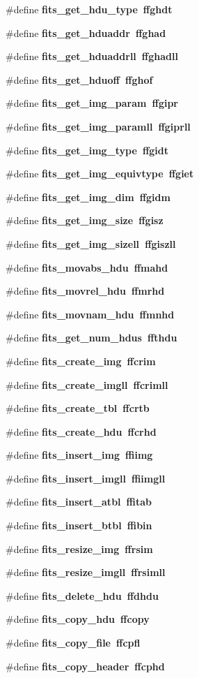 \begin{CompactItemize}
\#define \bf{fits\_\-get\_\-hdu\_\-type}~ffghdt
\item 
\#define \bf{fits\_\-get\_\-hduaddr}~ffghad
\item 
\#define \bf{fits\_\-get\_\-hduaddrll}~ffghadll
\item 
\#define \bf{fits\_\-get\_\-hduoff}~ffghof
\item 
\#define \bf{fits\_\-get\_\-img\_\-param}~ffgipr
\item 
\#define \bf{fits\_\-get\_\-img\_\-paramll}~ffgiprll
\item 
\#define \bf{fits\_\-get\_\-img\_\-type}~ffgidt
\item 
\#define \bf{fits\_\-get\_\-img\_\-equivtype}~ffgiet
\item 
\#define \bf{fits\_\-get\_\-img\_\-dim}~ffgidm
\item 
\#define \bf{fits\_\-get\_\-img\_\-size}~ffgisz
\item 
\#define \bf{fits\_\-get\_\-img\_\-sizell}~ffgiszll
\item 
\#define \bf{fits\_\-movabs\_\-hdu}~ffmahd
\item 
\#define \bf{fits\_\-movrel\_\-hdu}~ffmrhd
\item 
\#define \bf{fits\_\-movnam\_\-hdu}~ffmnhd
\item 
\#define \bf{fits\_\-get\_\-num\_\-hdus}~ffthdu
\item 
\#define \bf{fits\_\-create\_\-img}~ffcrim
\item 
\#define \bf{fits\_\-create\_\-imgll}~ffcrimll
\item 
\#define \bf{fits\_\-create\_\-tbl}~ffcrtb
\item 
\#define \bf{fits\_\-create\_\-hdu}~ffcrhd
\item 
\#define \bf{fits\_\-insert\_\-img}~ffiimg
\item 
\#define \bf{fits\_\-insert\_\-imgll}~ffiimgll
\item 
\#define \bf{fits\_\-insert\_\-atbl}~ffitab
\item 
\#define \bf{fits\_\-insert\_\-btbl}~ffibin
\item 
\#define \bf{fits\_\-resize\_\-img}~ffrsim
\item 
\#define \bf{fits\_\-resize\_\-imgll}~ffrsimll
\item 
\#define \bf{fits\_\-delete\_\-hdu}~ffdhdu
\item 
\#define \bf{fits\_\-copy\_\-hdu}~ffcopy
\item 
\#define \bf{fits\_\-copy\_\-file}~ffcpfl
\item 
\#define \bf{fits\_\-copy\_\-header}~ffcphd

\end{CompactItemize}
